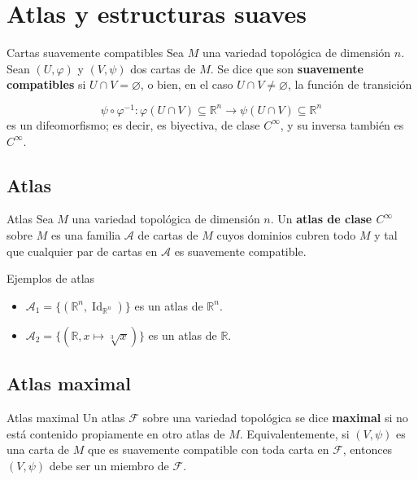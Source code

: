 \chapter{Atlas y estructuras suaves}
\label{ch:teo-4}
\begin{bookdefinition}{Cartas suavemente compatibles}
Sea $M$ una variedad topológica de dimensión $n$. Sean $(U,\varphi)$ y $(V,\psi)$ dos cartas de $M$. Se dice que son \textbf{suavemente compatibles} si $U\cap V=\varnothing$, o bien, en el caso $U\cap V\neq\varnothing$, la función de transición

\[
\psi\circ\varphi^{-1}:\varphi(U\cap V)\subseteq\mathbb{R}^n\to\psi(U\cap V)\subseteq\mathbb{R}^n
\]
es un difeomorfismo; es decir, es biyectiva, de clase $C^\infty$, y su inversa también es $C^\infty$.

\end{bookdefinition}
\section{Atlas}
\begin{bookdefinition}{Atlas}
Sea $M$ una variedad topológica de dimensión $n$. Un \textbf{atlas de clase $C^\infty$} sobre $M$ es una familia $\mathcal{A}$ de cartas de $M$ cuyos dominios cubren todo $M$ y tal que cualquier par de cartas en $\mathcal{A}$ es suavemente compatible.

\end{bookdefinition}
\begin{bookexample}{Ejemplos de atlas}
\begin{itemize}
\item $\mathcal{A}_1=\{(\mathbb{R}^n,\operatorname{Id}_{\mathbb{R}^n})\}$ es un atlas de $\mathbb{R}^n$.
\item $\mathcal{A}_2=\{(\mathbb{R},x\mapsto \sqrt[3]{x})\}$ es un atlas de $\mathbb{R}$.
\end{itemize}
\end{bookexample}
\section{Atlas maximal}
\begin{bookdefinition}{Atlas maximal}
Un atlas $\mathcal{F}$ sobre una variedad topológica se dice \textbf{maximal} si no está contenido propiamente en otro atlas de $M$. Equivalentemente, si $(V,\psi)$ es una carta de $M$ que es suavemente compatible con toda carta en $\mathcal{F}$, entonces $(V,\psi)$ debe ser un miembro de $\mathcal{F}$.

\end{bookdefinition}
